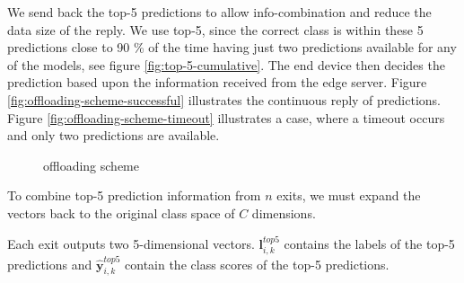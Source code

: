 We send back the top-5 predictions to allow info-combination and reduce the data size of the reply. We use top-5, since the correct class is within these 5 predictions close to 90 \% of the time having just two predictions available for any of the models, see figure \ref{fig:top-5-cumulative}. The end device then decides the prediction based upon the information received from the edge server. Figure \ref{fig:offloading-scheme-successful} illustrates the continuous reply of predictions. Figure \ref{fig:offloading-scheme-timeout} illustrates a case, where a timeout occurs and only two predictions are available.

\begin{figure}
	\captionsetup[subfigure]{justification=centering}
	\centering
	\hfill
	\caption[Offloading scheme]{offloading scheme}
	\label{fig:offloading-scheme}
\end{figure} 

To combine top-5 prediction information from $ n $ exits, we must expand the vectors back to the original class space of $ C $ dimensions.

Each exit outputs two 5-dimensional vectors. $\mathbf{l}_{i,k}^{top5}$ contains the labels of the top-5 predictions and $ \mathbf{\hat{y}}_{i,k}^{top5}$ contain the class scores of the top-5 predictions. 


